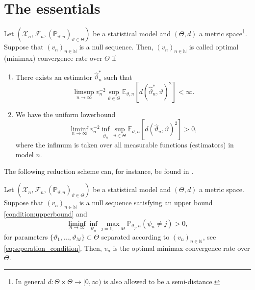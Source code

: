 \documentclass[a4paper]{article}
\begin{document}
\section{The essentials}
\begin{definition}
	Let $(\mathcal{X}_n, \mathcal{F}_n, (\mathbb{P}_{\vartheta,n})_{\vartheta \in \Theta})$ be a statistical model and $(\Theta, d)$ a metric space\footnote{In general $d:\Theta \times \Theta \rightarrow [0,\infty)$ is also allowed to be a semi-distance.}. Suppose that $(v_n)_{n \in \mathbb{N}}$ is a null sequence. Then, $(v_n)_{n \in \mathbb{N}}$ is called optimal (minimax) convergence rate over $\Theta$ if
	\begin{enumerate}
		\item There exists an estimator $\hat{\vartheta}_n^{*}$ such that
		      \begin{equation*}
			      \label{condition:upperbound}
			      \limsup_{n \rightarrow \infty} v_n^{-2} \sup_{\vartheta \in \Theta} \mathbb{E}_{\vartheta, n}[d(\hat{\vartheta}_n^{*}, \vartheta)^{2}]< \infty.
		      \end{equation*}
		\item We have the uniform lowerbound
		      \begin{equation*}
			      \liminf_{n \rightarrow \infty} v_n^{-2} \inf_{\hat{\vartheta}_n} \sup_{\vartheta \in \Theta} \mathbb{E}_{\vartheta,n}[d(\hat{\vartheta}_{n}, \vartheta)^{2}]>0,
		      \end{equation*}
		      where the infimum is taken over all measurable functions (estimators) in model $n$.
	\end{enumerate}
\end{definition}
The following reduction scheme can, for instance, be found in \citet[Chapter 2]{tsybakovIntroductionNonparametricEstimation2009}.
\begin{propositionrep}
	\label{result:reduction_scheme}
	Let $(\mathcal{X}_n, \mathcal{F}_n, (\mathbb{P}_{\vartheta,n})_{\vartheta \in \Theta})$ be a statistical model and $(\Theta, d)$ a metric space. Suppose that $(v_n)_{n \in \mathbb{N}}$ is a null sequence satisfying an upper bound \eqref{condition:upperbound} and
	\begin{equation*}
		\liminf_{n \rightarrow \infty} \inf_{\psi_n} \max_{j=1,\dots,M} \mathbb{P}_{\vartheta_j,n}(\psi_n \neq j)>0,
	\end{equation*}
	for parameters $\{\vartheta_1, \dots, \vartheta_M\} \subset \Theta$ separated according to $(v_n)_{n \in \mathbb{N}}$, see \eqref{eq:seperation_condition}.	Then, $v_n$ is the optimal minimax convergence rate over $\Theta$.
\end{propositionrep}
\end{document}
